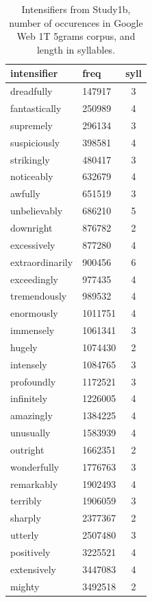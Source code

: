 \begin{table}[hbt]
 \begin{center}
 \footnotesize
  \caption{Intensifiers from Study1b, number of occurences in Google Web 1T 5grams corpus, and length in syllables.}
  \label{table:intensifiers_study1b}
  \begin{tabular}{llc}
   \hline
   intensifier & freq & syll \\
   \hline
    dreadfully & 147917 & 3 \\ 
    fantastically & 250989 & 4 \\ 
    supremely & 296134 & 3 \\ 
    suspiciously & 398581 & 4 \\ 
    strikingly & 480417 & 3 \\ 
    noticeably & 632679 & 4 \\ 
    awfully & 651519 & 3 \\ 
    unbelievably & 686210 & 5 \\ 
    downright & 876782 & 2 \\ 
    excessively & 877280 & 4 \\ 
    extraordinarily & 900456 & 6 \\ 
    exceedingly & 977435 & 4 \\ 
    tremendously & 989532 & 4 \\ 
    enormously & 1011751 & 4 \\ 
    immensely & 1061341 & 3 \\ 
    hugely & 1074430 & 2 \\ 
    intensely & 1084765 & 3 \\ 
    profoundly & 1172521 & 3 \\ 
    infinitely & 1226005 & 4 \\ 
    amazingly & 1384225 & 4 \\ 
    unusually & 1583939 & 4 \\ 
    outright & 1662351 & 2 \\ 
    wonderfully & 1776763 & 3 \\ 
    remarkably & 1902493 & 4 \\ 
    terribly & 1906059 & 3 \\ 
    sharply & 2377367 & 2 \\ 
    utterly & 2507480 & 3 \\ 
    positively & 3225521 & 4 \\ 
    extensively & 3447083 & 4 \\ 
    mighty & 3492518 & 2 \\ 

\end{tabular}
\end{center}
\end{table}

